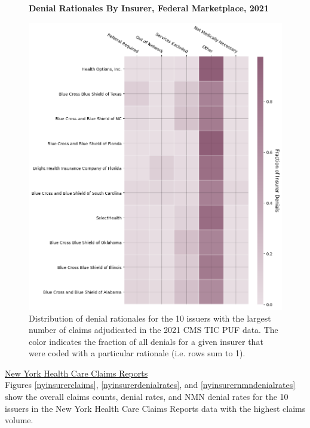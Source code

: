 \documentclass[12pt, a4paper,twoside]{report}
\theoremstyle{plain} %
\theoremstyle{definition} %
\theoremstyle{remark} %
\numberwithin{equation}{chapter}
\begin{document}
		\begin{figure}[h!]
			\centering
			\textbf{Denial Rationales By Insurer, Federal Marketplace, 2021}\par\medskip
			\includegraphics[width=\columnwidth]{images/cms_puf/insurer_vs_denial_cat.png}
			\caption{Distribution of denial rationales for the 10 issuers with the largest number of claims adjudicated in the 2021 CMS TIC PUF data. The color indicates the fraction of all denials for a given insurer that were coded with a particular rationale (i.e. rows sum to 1). }
			\label{feddenialrationalesbyinsurer}
		\end{figure}
	
		\clearpage
		
		
		
		\underline{New York Health Care Claims Reports}\\
		
				Figures \ref{nyinsurerclaims}, \ref{nyinsurerdenialrates}, and \ref{nyinsurernmndenialrates} show the overall claims counts, denial rates, and NMN denial rates for the 10 issuers in the New York Health Care Claims Reports data with the highest claims volume.
		
\end{document}
